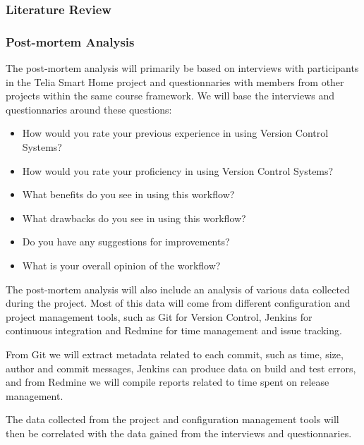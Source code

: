 \documentclass{article}
\begin{document}
\subsubsection{Literature Review}


\subsubsection{Post-mortem Analysis}
The post-mortem analysis will primarily be based on interviews with
participants in the Telia Smart Home project and questionnaries with
members from other projects within the same course framework. We will
base the interviews and questionnaries around these questions:

\begin{itemize}
 \item How would you rate your previous experience in using Version Control 
       Systems?
 \item How would you rate your proficiency in using Version Control Systems?
 \item What benefits do you see in using this workflow?
 \item What drawbacks do you see in using this workflow?
 \item Do you have any suggestions for improvements?
 \item What is your overall opinion of the workflow?
\end{itemize}

The post-mortem analysis will also include an analysis of various data
collected during the project. Most of this data will come from
different configuration and project management tools, such as Git for
Version Control, Jenkins for continuous integration and Redmine for
time management and issue tracking.

From Git we will extract metadata related to each commit, such as
time, size, author and commit messages, Jenkins can produce data on
build and test errors, and from Redmine we will compile reports
related to time spent on release management.

The data collected from the project and configuration management tools
will then be correlated with the data gained from the interviews and
questionnaries.

 

\end{document}
